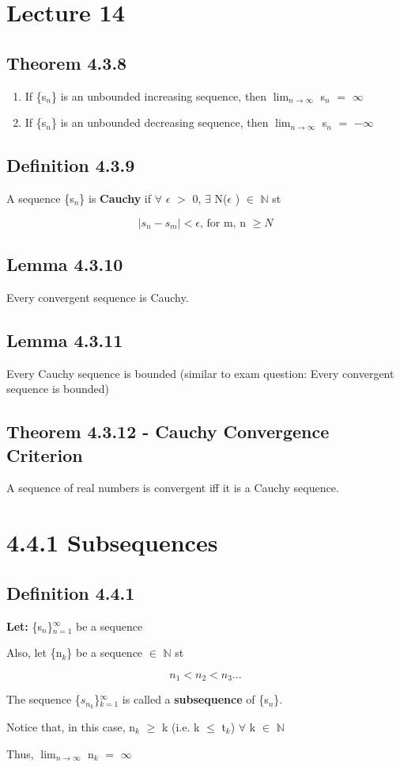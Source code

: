\documentclass{article}
\newcommand{\mt}[1]{\ensuremath{#1}}
\newcommand\bsc[2][\DefaultOpt]{%
  \def\DefaultOpt{#2}%
  \section[#1]{#2}%
}
\newcommand\ssc[2][\DefaultOpt]{%
  \def\DefaultOpt{#2}%
  \subsection[#1]{#2}%
}
\newcommand{\balist}{\begin{enumerate}[label=\alph*.]}
\newcommand{\elist}{\end{enumerate}}
\newcommand{\lt}[1]{\textbf{Let: } #1}
\newcommand{\dbs}[3]{\mt{#1_{#2_#3}}}
\newcommand{\bn}{\mt{\mathbb{N}} }       %
\newcommand{\ep}{\mt{\epsilon} }         %
\newcommand{\fa}{\mt{\forall} }          %
\newcommand{\mem}{\mt{\in} }
\newcommand{\exs}{\mt{\exists} }
\newcommand{\bk}[1]{\{#1\}}
\newcommand{\gr}{\mt{>} }
\newcommand{\lse}{\mt{\leq} }
\newcommand{\gre}{\mt{\geq} }
\newcommand{\eql}{\mt{=} }
\newcommand{\uw}[2]{#1\mt{_{#2}}}
\newcommand{\lmti}[1]{\mt{\displaystyle{\lim_{#1 \to \infty}}}}
\newcommand{\eqn}[1]{\[#1\]}
\begin{document}
\newpage

\bsc{Lecture 14}{

\ssc{Theorem 4.3.8}{

\balist
\item If \bk{\uw{s}{n}} is an unbounded increasing sequence, then \lmti{n} \uw{s}{n} \eql $\infty$
\item If \bk{\uw{s}{n}} is an unbounded decreasing sequence, then \lmti{n} \uw{s}{n} \eql $-\infty$
\elist

}

\ssc{Definition 4.3.9}{

A sequence \bk{\uw{s}{n}} is \textbf{Cauchy} if \fa \ep \gr 0, \exs N(\ep) \mem \bn st

\eqn{|s_n - s_m| < \ep\textrm{, for m, n }\gre N}

}

\ssc{Lemma 4.3.10}{

Every convergent sequence is Cauchy.

}

\ssc{Lemma 4.3.11}{

Every Cauchy sequence is bounded (similar to exam question: Every convergent sequence is bounded)

}

\ssc{Theorem 4.3.12 - Cauchy Convergence Criterion}{

A sequence of real numbers is convergent iff it is a Cauchy sequence.

}

\bsc{4.4.1 Subsequences}{

\ssc{Definition 4.4.1}{

\lt{\bk{\uw{s}{n}}$^\infty_{n = 1}$ be a sequence}

Also, let \bk{\uw{n}{k}} be a sequence \mem \bn st

\eqn{n_1 < n_2 < n_3 ...}

The sequence \bk{\dbs{s}{n}{k}}$^\infty_{k = 1}$ is called a \textbf{subsequence} of \bk{\uw{s}{n}}.

Notice that, in this case, \uw{n}{k} \gre k (i.e. k \lse \uw{t}{k}) \fa k \mem \bn

Thus, \lmti{n} \uw{n}{k} \eql $\infty$
}
}

}
\end{document}
